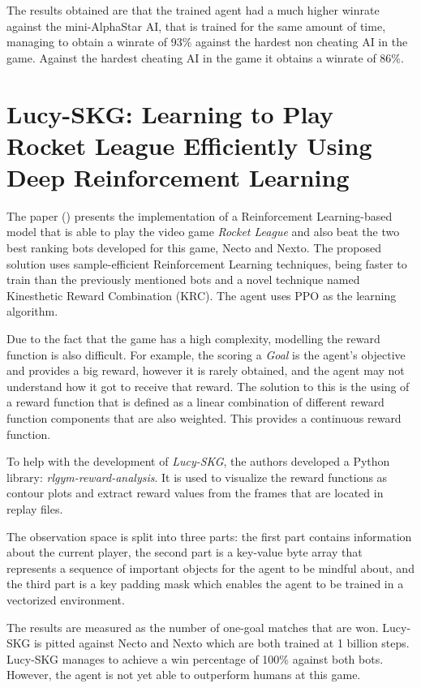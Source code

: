 The results obtained are that the trained agent had a much higher winrate against the mini-AlphaStar AI, that is trained for the same amount of time, managing to obtain a winrate of 93\% against the hardest non cheating AI in the game. Against the hardest cheating AI in the game it obtains a winrate of 86\%.



\section{Lucy-SKG: Learning to Play Rocket League Efficiently Using Deep Reinforcement Learning}
The paper (\cite{moschopoulos2023lucyskgrocketleague}) presents the implementation of a Reinforcement Learning-based model that is able to play the video game \emph{Rocket League} and also beat the two best ranking bots developed for this game, Necto and Nexto. The proposed solution uses sample-efficient Reinforcement Learning techniques, being faster to train than the previously mentioned bots and a novel technique named Kinesthetic Reward Combination (KRC). The agent uses PPO as the learning algorithm.

Due to the fact that the game has a high complexity, modelling the reward function is also difficult. For example, the scoring a \emph{Goal} is the agent's objective and provides a big reward, however it is rarely obtained, and the agent may not understand how it got to receive that reward. The solution to this is the using of a reward function that is defined as a linear combination of different reward function components that are also weighted. This provides a continuous reward function.

To help with the development of \emph{Lucy-SKG}, the authors developed a Python library: \emph{rlgym-reward-analysis}. It is used to visualize the reward functions as contour plots and extract reward values from the frames that are located in replay files.

The observation space is split into three parts: the first part contains information about the current player, the second part is a key-value byte array that represents a sequence of important objects for the agent to be mindful about, and the third part is a key padding mask which enables the agent to be trained in a vectorized environment.

The results are measured as the number of one-goal matches that are won. Lucy-SKG is pitted against Necto and Nexto which are both trained at 1 billion steps. Lucy-SKG manages to achieve a win percentage of 100\% against both bots. However, the agent is not yet able to outperform humans at this game.



